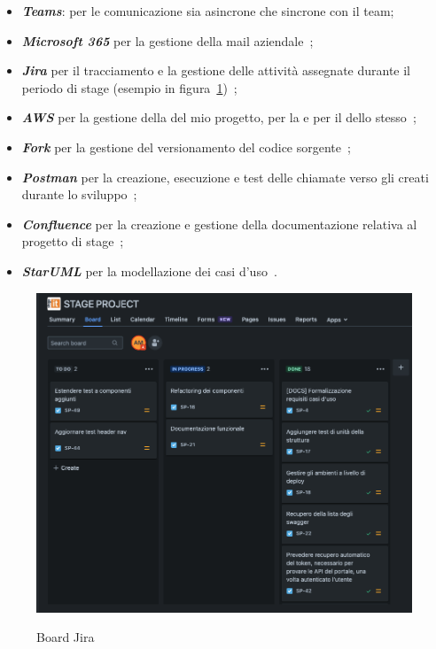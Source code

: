 \begin{itemize}
  \item \textbf{\textit{Teams}}: per le comunicazione sia asincrone che sincrone con il team;
  \item \textbf{\textit{Microsoft 365}} per la gestione della mail aziendale~\cite{site:microsoft365};
  \item \textbf{\textit{Jira}} per il tracciamento e la gestione delle attività assegnate durante il periodo di stage (esempio in figura~\ref{fig:board-jira})~\cite{site:jira};
  \item \textbf{\textit{AWS}} per la gestione della  del mio progetto, per la  e per il  dello stesso~\cite{site:aws};
  \item \textbf{\textit{Fork}} per la gestione del versionamento del codice sorgente~\cite{site:fork};
  \item \textbf{\textit{Postman}} per la creazione, esecuzione e test delle chiamate verso gli  creati durante lo sviluppo~\cite{site:postman};
  \item \textbf{\textit{Confluence}} per la creazione e gestione della documentazione relativa al progetto di stage~\cite{site:confluence};
  \item \textbf{\textit{StarUML}} per la modellazione dei casi d'uso~\cite{site:staruml}.
\end{itemize}

\begin{figure}[!ht] 
  \centering 
  \includegraphics[width=0.9\columnwidth, alt={Esempio di utilizzo della board di Jira}]{images/Board.jpg}
  \caption{Board Jira}\label{fig:board-jira}
\end{figure}

